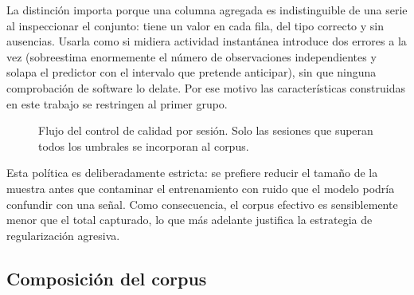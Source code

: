 La distinción importa porque una columna agregada es indistinguible de una serie al
inspeccionar el conjunto: tiene un valor en cada fila, del tipo correcto y sin ausencias.
Usarla como si midiera actividad instantánea introduce dos errores a la vez (sobreestima
enormemente el número de observaciones independientes y solapa el predictor con el intervalo
que pretende anticipar), sin que ninguna comprobación de software lo delate. Por ese motivo
las características construidas en este trabajo se restringen al primer grupo.

\begin{figure}[h]
\centering
{}
\caption{Flujo del control de calidad por sesión. Solo las sesiones que superan todos los
umbrales se incorporan al corpus.}
\label{fig:qa}
\end{figure}

Esta política es deliberadamente estricta: se prefiere reducir el tamaño de la muestra antes
que contaminar el entrenamiento con ruido que el modelo podría confundir con una señal. Como consecuencia, el corpus
efectivo es sensiblemente menor que el total capturado, lo que más adelante justifica la
estrategia de regularización agresiva.

\subsection{Composición del corpus}

